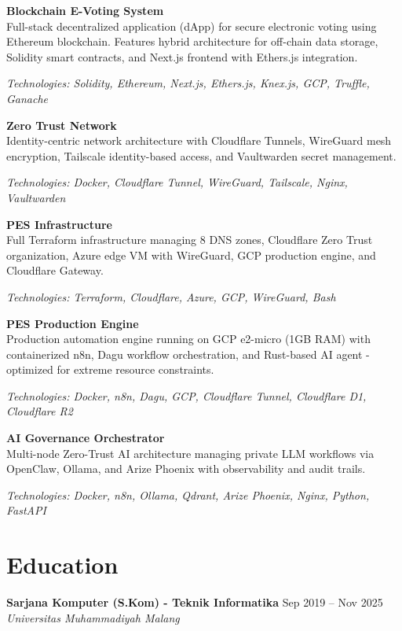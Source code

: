 \documentclass[11pt,a4paper]{article}
\newcommand{\eduentry}[3]{%
    \vspace{1pt}
    \textbf{#1} \hfill {#2} \\
    \textit{#3}
}
\newcommand{\projectentry}[2]{%
    \vspace{1pt}
    \textbf{#1} \\
    #2
}
\begin{document}
\projectentry{Blockchain E-Voting System}{Full-stack decentralized application (dApp) for secure electronic voting using Ethereum blockchain. Features hybrid architecture for off-chain data storage, Solidity smart contracts, and Next.js frontend with Ethers.js integration.}
\textit{Technologies: Solidity, Ethereum, Next.js, Ethers.js, Knex.js, GCP, Truffle, Ganache}

\vspace{1pt}

\projectentry{Zero Trust Network}{Identity-centric network architecture with Cloudflare Tunnels, WireGuard mesh encryption, Tailscale identity-based access, and Vaultwarden secret management.}
\textit{Technologies: Docker, Cloudflare Tunnel, WireGuard, Tailscale, Nginx, Vaultwarden}

\vspace{1pt}

\projectentry{PES Infrastructure}{Full Terraform infrastructure managing 8 DNS zones, Cloudflare Zero Trust organization, Azure edge VM with WireGuard, GCP production engine, and Cloudflare Gateway.}
\textit{Technologies: Terraform, Cloudflare, Azure, GCP, WireGuard, Bash}

\vspace{1pt}

\projectentry{PES Production Engine}{Production automation engine running on GCP e2-micro (1GB RAM) with containerized n8n, Dagu workflow orchestration, and Rust-based AI agent - optimized for extreme resource constraints.}
\textit{Technologies: Docker, n8n, Dagu, GCP, Cloudflare Tunnel, Cloudflare D1, Cloudflare R2}

\vspace{1pt}

\projectentry{AI Governance Orchestrator}{Multi-node Zero-Trust AI architecture managing private LLM workflows via OpenClaw, Ollama, and Arize Phoenix with observability and audit trails.}
\textit{Technologies: Docker, n8n, Ollama, Qdrant, Arize Phoenix, Nginx, Python, FastAPI}

\section*{Education}

\eduentry{Sarjana Komputer (S.Kom) - Teknik Informatika}{Sep 2019 -- Nov 2025}
{Universitas Muhammadiyah Malang}
\end{document}
